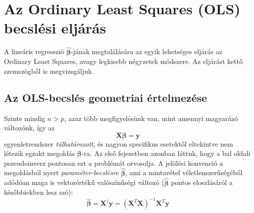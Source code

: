 \documentclass[14p]{report}
\def\pmb{\boldsymbol}
\def\ebeta{\hat{\pmb{\beta}}}
\begin{document}
	\section{Az Ordinary Least Squares (OLS) becslési eljárás}
	A lineáris regresszió $\ebeta$-jának megtalálására az egyik lehetséges eljárás az Ordinary Least Squares, avagy legkisebb négyzetek módszere. Az eljárást kettő szemszögből is megvizsgáljuk.
	
	\subsection{Az OLS-becslés geometriai értelmezése}
	Szinte mindig $n > p$, azaz több megfigyelésünk van, mint amennyi magyarázó változónk, így az
	\[
		\pmb{X}\pmb{\beta} = \pmb{y}
	\]
	 egyenletrendszer \emph{túlhatározott}, és nagyon specifikus esetektől eltekintve nem létezik egzakt megoldás $\pmb{\beta}$-ra. Az első fejezetben azonban láttuk, hogy a bal oldali pszeudoinverz pontosan ezt a problémát orvosolja. A jelölési konvenció a megoldásból nyert \emph{paraméter-becslésre} $\ebeta$, ami a mintavétel véletlenszerűségéből adódóan maga is vektorértékű valószínűségi változó ($\ebeta$ pontos eloszlásáról a későbbiekben lesz szó):
	\[
	\ebeta = \pmb{X}^{\dagger}\pmb{y} = (\pmb{X}^T\pmb{X})^{-1}\pmb{X}^T\pmb{y}
	\]
	
\end{document}
